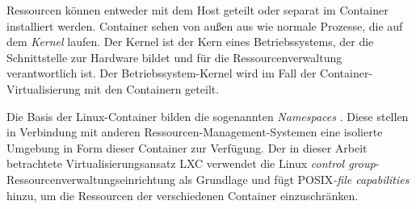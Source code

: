 Ressourcen können entweder mit dem Host geteilt oder separat im Container installiert werden. Container sehen von außen aus wie normale Prozesse, die auf dem \emph{Kernel} laufen. Der Kernel ist der Kern eines Betriebssystems, der die Schnittstelle zur Hardware bildet und für die Ressourcenverwaltung verantwortlich ist. Der Betriebssystem-Kernel wird im Fall der Container-Virtualisierung mit den Containern geteilt. 

Die Basis der Linux-Container bilden die sogenannten \emph{Namespaces} \cite{Also2018Man7.orgMan-pages}. Diese stellen in Verbindung mit anderen Ressourcen-Management-Systemen eine isolierte Umgebung in Form dieser Container zur Verfügung. Der in dieser Arbeit betrachtete Virtualisierungsansatz LXC verwendet die Linux \emph{control group}-Ressourcenverwaltungseinrichtung als Grundlage \cite{Heo2015ControlV2} und fügt \ac{POSIX}\emph{-file capabilities} \cite{Overview2018PaperLinux-VServer} hinzu, um die Ressourcen der verschiedenen Container einzuschränken.







